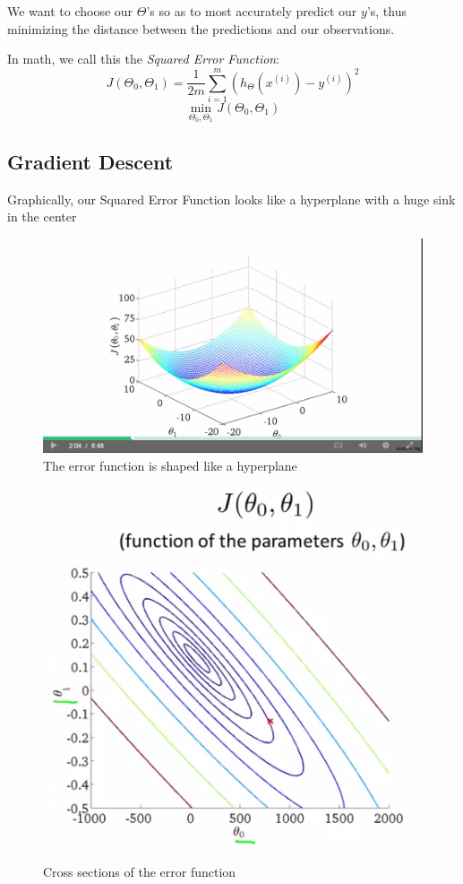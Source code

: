 \documentclass[twoside, 11pt-]{article}
\begin{document}
We want to choose our $\Theta$'s so as to most accurately predict our $y$'s, thus minimizing the distance between the predictions and our observations.

In math, we call this the \emph{Squared Error Function}:
\[J(\Theta_0, \Theta_1) = \frac{1}{2m} \sum_{i = 1}^{m} (h_\Theta (x^{(i)}) - y^{(i)})^2\]
\vspace{-1cm}
\[\min_{\Theta_0, \Theta_1} J(\Theta_0, \Theta_1)\]

\subsection{Gradient Descent}

Graphically, our Squared Error Function looks like a hyperplane with a huge sink in the center

\begin{figure}[h]
\includegraphics[scale = .5]{1a}
\centering
\caption{The error function is shaped like a hyperplane}
\end{figure}

\begin{figure}[h!]
\includegraphics[scale = .75]{1b}
\centering
\caption{Cross sections of the error function}
\end{figure}
\end{document}
